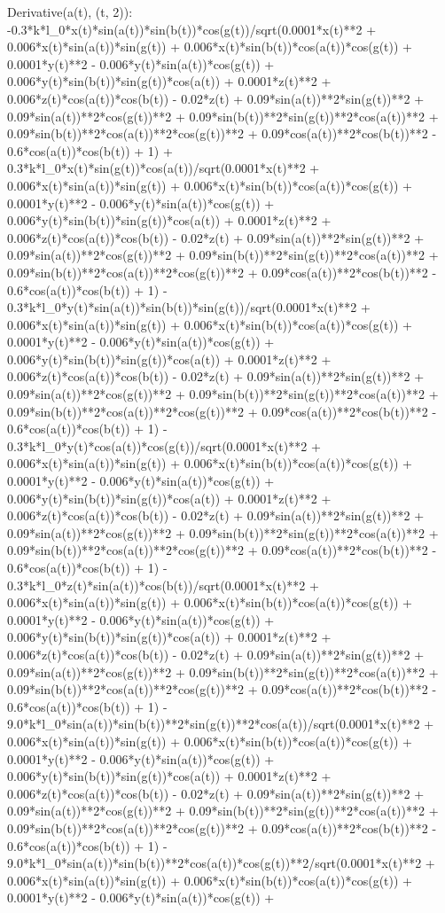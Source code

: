 Derivative(a(t), (t, 2)): -0.3*k*l_0*x(t)*sin(a(t))*sin(b(t))*cos(g(t))/sqrt(0.0001*x(t)**2 + 0.006*x(t)*sin(a(t))*sin(g(t)) + 0.006*x(t)*sin(b(t))*cos(a(t))*cos(g(t)) + 0.0001*y(t)**2 - 0.006*y(t)*sin(a(t))*cos(g(t)) + 0.006*y(t)*sin(b(t))*sin(g(t))*cos(a(t)) + 0.0001*z(t)**2 + 0.006*z(t)*cos(a(t))*cos(b(t)) - 0.02*z(t) + 0.09*sin(a(t))**2*sin(g(t))**2 + 0.09*sin(a(t))**2*cos(g(t))**2 + 0.09*sin(b(t))**2*sin(g(t))**2*cos(a(t))**2 + 0.09*sin(b(t))**2*cos(a(t))**2*cos(g(t))**2 + 0.09*cos(a(t))**2*cos(b(t))**2 - 0.6*cos(a(t))*cos(b(t)) + 1) + 0.3*k*l_0*x(t)*sin(g(t))*cos(a(t))/sqrt(0.0001*x(t)**2 + 0.006*x(t)*sin(a(t))*sin(g(t)) + 0.006*x(t)*sin(b(t))*cos(a(t))*cos(g(t)) + 0.0001*y(t)**2 - 0.006*y(t)*sin(a(t))*cos(g(t)) + 0.006*y(t)*sin(b(t))*sin(g(t))*cos(a(t)) + 0.0001*z(t)**2 + 0.006*z(t)*cos(a(t))*cos(b(t)) - 0.02*z(t) + 0.09*sin(a(t))**2*sin(g(t))**2 + 0.09*sin(a(t))**2*cos(g(t))**2 + 0.09*sin(b(t))**2*sin(g(t))**2*cos(a(t))**2 + 0.09*sin(b(t))**2*cos(a(t))**2*cos(g(t))**2 + 0.09*cos(a(t))**2*cos(b(t))**2 - 0.6*cos(a(t))*cos(b(t)) + 1) - 0.3*k*l_0*y(t)*sin(a(t))*sin(b(t))*sin(g(t))/sqrt(0.0001*x(t)**2 + 0.006*x(t)*sin(a(t))*sin(g(t)) + 0.006*x(t)*sin(b(t))*cos(a(t))*cos(g(t)) + 0.0001*y(t)**2 - 0.006*y(t)*sin(a(t))*cos(g(t)) + 0.006*y(t)*sin(b(t))*sin(g(t))*cos(a(t)) + 0.0001*z(t)**2 + 0.006*z(t)*cos(a(t))*cos(b(t)) - 0.02*z(t) + 0.09*sin(a(t))**2*sin(g(t))**2 + 0.09*sin(a(t))**2*cos(g(t))**2 + 0.09*sin(b(t))**2*sin(g(t))**2*cos(a(t))**2 + 0.09*sin(b(t))**2*cos(a(t))**2*cos(g(t))**2 + 0.09*cos(a(t))**2*cos(b(t))**2 - 0.6*cos(a(t))*cos(b(t)) + 1) - 0.3*k*l_0*y(t)*cos(a(t))*cos(g(t))/sqrt(0.0001*x(t)**2 + 0.006*x(t)*sin(a(t))*sin(g(t)) + 0.006*x(t)*sin(b(t))*cos(a(t))*cos(g(t)) + 0.0001*y(t)**2 - 0.006*y(t)*sin(a(t))*cos(g(t)) + 0.006*y(t)*sin(b(t))*sin(g(t))*cos(a(t)) + 0.0001*z(t)**2 + 0.006*z(t)*cos(a(t))*cos(b(t)) - 0.02*z(t) + 0.09*sin(a(t))**2*sin(g(t))**2 + 0.09*sin(a(t))**2*cos(g(t))**2 + 0.09*sin(b(t))**2*sin(g(t))**2*cos(a(t))**2 + 0.09*sin(b(t))**2*cos(a(t))**2*cos(g(t))**2 + 0.09*cos(a(t))**2*cos(b(t))**2 - 0.6*cos(a(t))*cos(b(t)) + 1) - 0.3*k*l_0*z(t)*sin(a(t))*cos(b(t))/sqrt(0.0001*x(t)**2 + 0.006*x(t)*sin(a(t))*sin(g(t)) + 0.006*x(t)*sin(b(t))*cos(a(t))*cos(g(t)) + 0.0001*y(t)**2 - 0.006*y(t)*sin(a(t))*cos(g(t)) + 0.006*y(t)*sin(b(t))*sin(g(t))*cos(a(t)) + 0.0001*z(t)**2 + 0.006*z(t)*cos(a(t))*cos(b(t)) - 0.02*z(t) + 0.09*sin(a(t))**2*sin(g(t))**2 + 0.09*sin(a(t))**2*cos(g(t))**2 + 0.09*sin(b(t))**2*sin(g(t))**2*cos(a(t))**2 + 0.09*sin(b(t))**2*cos(a(t))**2*cos(g(t))**2 + 0.09*cos(a(t))**2*cos(b(t))**2 - 0.6*cos(a(t))*cos(b(t)) + 1) - 9.0*k*l_0*sin(a(t))*sin(b(t))**2*sin(g(t))**2*cos(a(t))/sqrt(0.0001*x(t)**2 + 0.006*x(t)*sin(a(t))*sin(g(t)) + 0.006*x(t)*sin(b(t))*cos(a(t))*cos(g(t)) + 0.0001*y(t)**2 - 0.006*y(t)*sin(a(t))*cos(g(t)) + 0.006*y(t)*sin(b(t))*sin(g(t))*cos(a(t)) + 0.0001*z(t)**2 + 0.006*z(t)*cos(a(t))*cos(b(t)) - 0.02*z(t) + 0.09*sin(a(t))**2*sin(g(t))**2 + 0.09*sin(a(t))**2*cos(g(t))**2 + 0.09*sin(b(t))**2*sin(g(t))**2*cos(a(t))**2 + 0.09*sin(b(t))**2*cos(a(t))**2*cos(g(t))**2 + 0.09*cos(a(t))**2*cos(b(t))**2 - 0.6*cos(a(t))*cos(b(t)) + 1) - 9.0*k*l_0*sin(a(t))*sin(b(t))**2*cos(a(t))*cos(g(t))**2/sqrt(0.0001*x(t)**2 + 0.006*x(t)*sin(a(t))*sin(g(t)) + 0.006*x(t)*sin(b(t))*cos(a(t))*cos(g(t)) + 0.0001*y(t)**2 - 0.006*y(t)*sin(a(t))*cos(g(t)) + 